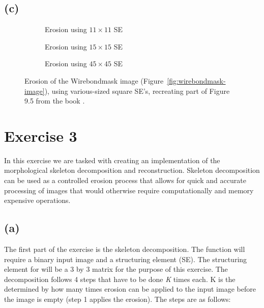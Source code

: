 \documentclass{article}
\begin{document}
\subsection*{(c)}
\begin{figure}[H]
     \centering
     \begin{subfigure}[b]{0.3\textwidth}
         \centering
         
         \caption{Erosion using $11 \times 11$ SE}
         \label{fig:book9.5figure-wirebondmask-image-11x11}
     \end{subfigure}
     \hfill
     \begin{subfigure}[b]{0.3\textwidth}
         \centering
         
         \caption{Erosion using $15 \times 15$ SE}
         \label{fig:book9.5figure-wirebondmask-image-15x15}
     \end{subfigure}
     \hfill
     \begin{subfigure}[b]{0.3\textwidth}
         \centering
         
         \caption{Erosion using $45 \times 45$ SE}
         \label{fig:book9.5figure-wirebondmask-image-45x45}
     \end{subfigure}
     
    \caption{Erosion of the Wirebondmask image (Figure~\ref{fig:wirebondmask-image}), using various-sized square SE's, recreating part of Figure 9.5 from the book \citep{gonzalez2008digital}.}
    \label{fig:book9.5figure}
\end{figure}

\newpage
\section*{Exercise 3}
In this exercise we are tasked with creating an implementation of the morphological skeleton decomposition and reconstruction. Skeleton decomposition can be used as a controlled erosion process that allows for quick and accurate processing of images that would otherwise require computationally and memory expensive operations.

\subsection*{(a)}
The first part of the exercise is the skeleton decomposition. The function will require a binary input image and a structuring element (SE). The structuring element for will be a 3 by 3 matrix for the purpose of this exercise. The decomposition follows 4 steps that have to be done \textit{K} times each. K is the determined by how many times erosion can be applied to the input image before the image is empty (step 1 applies the erosion). The steps are as follows:
\end{document}
